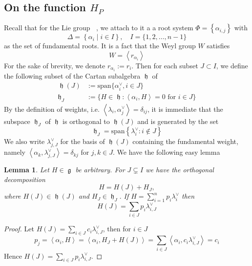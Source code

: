 \documentclass[12pt]{article} %
\newtheorem{lemma}[definition]{Lemma}
\DeclareMathOperator{\SLn}{\text{SL}_n(\mathbb{R})}
\DeclareMathOperator{\fg}{\mathfrak{g}}
\DeclareMathOperator{\fh}{\mathfrak{h}}
\DeclareMathOperator{\slnr}{\mathfrak{sl}_n(\mathbb{R})}
\begin{document}
\subsection{On the function $H_P$}
Recall that for the Lie group $\SLn$, we attach to it a 
a root system $\Phi = \left\lbrace \alpha_{i,j}\right\rbrace$ with 
\[\Delta = \left\lbrace \alpha_i\mid i \in I \right\rbrace, \quad I = \{1,2,\ldots,n-1\}\]
as the set of fundamental roots. It is a fact that the Weyl group $W$ satisfies
\[W = \left\langle r_{\alpha_i} \right\rangle\]
For the sake of brevity, we denote $r_{\alpha_i}:=r_i$. Then for each subset $J \subset I$, 
we define the following subset of the Cartan subalgebra $\fh$ of $\slnr$
\begin{align*}
    \fh(J)&:=\text{span}\{ \alpha^\vee_i, i \in J\}\\
    \fh_J &:= \{H \in \fh: \left\langle \alpha_i,H\right\rangle=0 \mbox{ for } i \in J \}
\end{align*}
By the definition of weights, i.e. $\left\langle \lambda_i,\alpha^\vee_j \right\rangle = \delta_{ij}$, it is immediate 
that the subspace $\fh_J$ of $\fh$ is orthogonal to $\fh(J)$ and is generated by the set 
\[\fh_J = \text{span}\left\lbrace \lambda^\vee_i: i \notin J\right\rbrace \]
We also write $\lambda^{\vee}_{j,J}$ for the basis of $\fh(J)$ containing the fundamental 
weight, namely $\left\langle \alpha_k,\lambda^{\vee}_{j,J}\right\rangle = \delta_{kj}$ for $j,k \in J$. We have 
the following easy lemma
\begin{lemma}\label{coeff-H(J)}
    Let $H \in \fg$ be arbitrary. For $J \subsetneq I$ we have the orthogonal decomposition
    \[H = H(J)+H_J,\]
    where $H(J) \in \fh(J)$ and $H_J \in \fh_J$. If $H = \sum_{i=1}^n p_i\lambda^\vee_i$ then
    \[H(J) = \sum_{i \in J} p_i \lambda^\vee_{i,J}\]
\end{lemma}
\begin{proof}
    Let $H(J) = \sum_{i \in J} c_i \lambda^\vee_{i,J}$, then for $i \in J$
    \[p_j = \left\langle \alpha_i,H \right\rangle =\left\langle \alpha_i,H_J+H(J) \right\rangle = \sum_{i \in J}\left\langle \alpha_i,  c_i \lambda^\vee_{i,J}\right\rangle=c_i \]
    Hence $H(J) = \sum_{i \in J} p_i \lambda^\vee_{i,J}$.
\end{proof}
\end{document}
